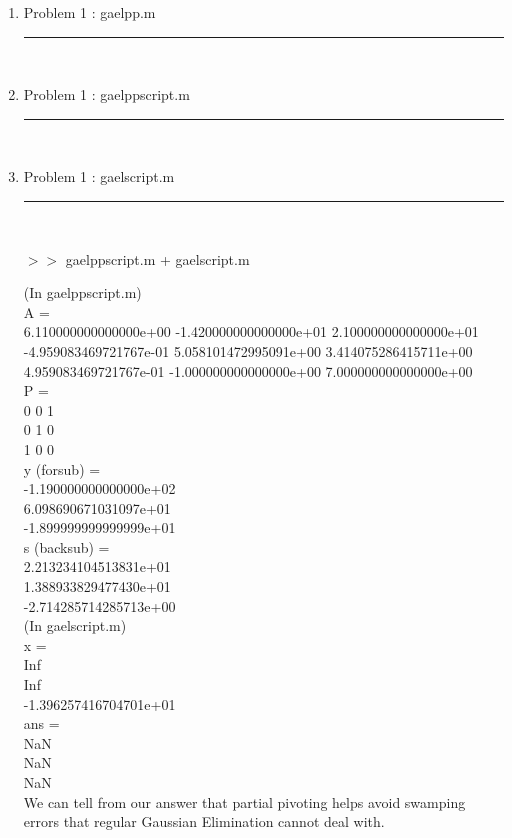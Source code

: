 \documentclass[12pt]{article}
\newcommand*\lstinputpath[1]{\lstset{inputpath=#1}}
\begin{document}
	\begin{enumerate}
	
	\item[] Problem 1 : gaelpp.m \noindent\rule{\textwidth}{1.0pt} \\
	\lstinputpath{P1}
	
	
	\item[] Problem 1 : gaelppscript.m \noindent\rule{\textwidth}{1.0pt} \\
		
	
	\item[] Problem 1 : gaelscript.m \noindent\rule{\textwidth}{1.0pt} \\
		
	
	\pagebreak	
	
	$>>$ gaelppscript.m + gaelscript.m
	\begin{framed}
	(In gaelppscript.m)\\
	A =\\
     6.110000000000000e+00    -1.420000000000000e+01     2.100000000000000e+01\\
    -4.959083469721767e-01     5.058101472995091e+00     3.414075286415711e+00\\
     4.959083469721767e-01    -1.000000000000000e+00     7.000000000000000e+00\\


	P =\\
     0     0     1\\
     0     1     0\\
     1     0     0\\


	y (forsub) =\\
    -1.190000000000000e+02\\
     6.098690671031097e+01\\
    -1.899999999999999e+01\\


	s (backsub) =\\
     2.213234104513831e+01\\
     1.388933829477430e+01\\
    -2.714285714285713e+00\\
    
   (In gaelscript.m)\\ 
    x =\\
                       Inf\\
                       Inf\\
    -1.396257416704701e+01\\


ans =\\
   NaN\\
   NaN\\
   NaN\\

We can tell from our answer that partial pivoting helps avoid swamping errors that regular Gaussian Elimination cannot deal with.
	\end{framed}
	
	\end{enumerate}
	
\end{document}
